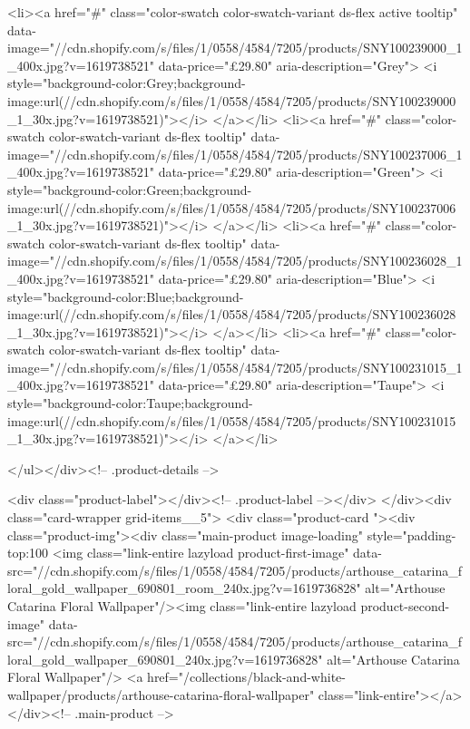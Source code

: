 {{{{{{{<li><a href="#" class="color-swatch color-swatch-variant ds-flex active tooltip" data-image="//cdn.shopify.com/s/files/1/0558/4584/7205/products/SNY100239000_1_400x.jpg?v=1619738521" data-price="£29.80" aria-description="Grey">
              <i style="background-color:Grey;background-image:url(//cdn.shopify.com/s/files/1/0558/4584/7205/products/SNY100239000_1_30x.jpg?v=1619738521)"></i>
            </a></li>
<li><a href="#" class="color-swatch color-swatch-variant ds-flex tooltip" data-image="//cdn.shopify.com/s/files/1/0558/4584/7205/products/SNY100237006_1_400x.jpg?v=1619738521" data-price="£29.80" aria-description="Green">
              <i style="background-color:Green;background-image:url(//cdn.shopify.com/s/files/1/0558/4584/7205/products/SNY100237006_1_30x.jpg?v=1619738521)"></i>
            </a></li>
<li><a href="#" class="color-swatch color-swatch-variant ds-flex tooltip" data-image="//cdn.shopify.com/s/files/1/0558/4584/7205/products/SNY100236028_1_400x.jpg?v=1619738521" data-price="£29.80" aria-description="Blue">
              <i style="background-color:Blue;background-image:url(//cdn.shopify.com/s/files/1/0558/4584/7205/products/SNY100236028_1_30x.jpg?v=1619738521)"></i>
            </a></li>
<li><a href="#" class="color-swatch color-swatch-variant ds-flex tooltip" data-image="//cdn.shopify.com/s/files/1/0558/4584/7205/products/SNY100231015_1_400x.jpg?v=1619738521" data-price="£29.80" aria-description="Taupe">
              <i style="background-color:Taupe;background-image:url(//cdn.shopify.com/s/files/1/0558/4584/7205/products/SNY100231015_1_30x.jpg?v=1619738521)"></i>
            </a></li>

      </ul></div><!-- .product-details -->

<div class="product-label"></div><!-- .product-label --></div>
          </div><div class="card-wrapper grid-items__5">
            <div class="product-card "><div class="product-img"><div class="main-product image-loading" style="padding-top:100%
      <img class="link-entire lazyload product-first-image" data-src="//cdn.shopify.com/s/files/1/0558/4584/7205/products/arthouse_catarina_floral_gold_wallpaper_690801_room_240x.jpg?v=1619736828" alt="Arthouse Catarina Floral Wallpaper"/><img class="link-entire lazyload product-second-image" data-src="//cdn.shopify.com/s/files/1/0558/4584/7205/products/arthouse_catarina_floral_gold_wallpaper_690801_240x.jpg?v=1619736828" alt="Arthouse Catarina Floral Wallpaper"/>
      <a href="/collections/black-and-white-wallpaper/products/arthouse-catarina-floral-wallpaper" class="link-entire"></a>
    </div><!-- .main-product -->
  
}}}}}}}
